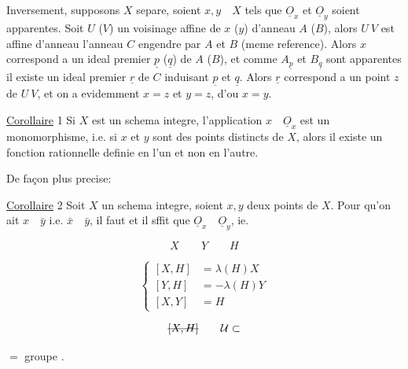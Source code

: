 Inversement, supposons \(X\) separe, soient \(x,y\quad X\) tels que \(\underline O_x\) et \(\underline O_y\) soient apparentes. Soit \(U\) (\(V\)) un voisinage affine de \(x\) (\(y\)) d'anneau \(A\) (\(B\)), alors \(U\ V\) est affine d'anneau l'anneau \(C\) engendre par \(A\) et \(B\) (meme reference).  Alors \(x\) correspond a un ideal premier \(\underline p\) (\(\underline q\)) de \(A\) (\(B\)), et comme  \(A_{\underline p}\) et \(B_{\underline q}\) sont apparentes il existe un ideal premier \(\underline r\) de \(C\) induisant \(\underline p\) et \(\underline q\). Alors \(\underline r\) correspond a un point \(z\) de \(U\ V\), et on a evidemment \(x=z\) et \(y=z\), d'ou \(x=y\).

\uline{Corollaire} 1 Si \(X\) est un schema integre, l'application \(x\quad\underline O_x\) est un monomorphisme, i.e. si \(x\) et \(y\) sont des points distincts de \(X\), alors il existe un fonction rationnelle definie en l'un et non en l'autre.

De façon plus precise:

\uline{Corollaire} 2 Soit \(X\) un schema integre, soient \(x,y\) deux points de \(X\). Pour qu'on ait \(x\quad\bar y\) i.e. \(\bar x\quad\bar y\), il faut et il sffit que \(\underline O_x\quad\underline O_y\), ie.

\[
X\qquad Y\qquad H
\]

\[
\left\{\begin{aligned}
[X,H]&=\lambda(H)X\\
[Y,H]&=-\lambda(H)Y\\
[X,Y]&=H
\end{aligned}\right.
\]


\[
\deleted{[X,H]}\qquad \mathcal U\subset
\]


   \(=\) groupe .

